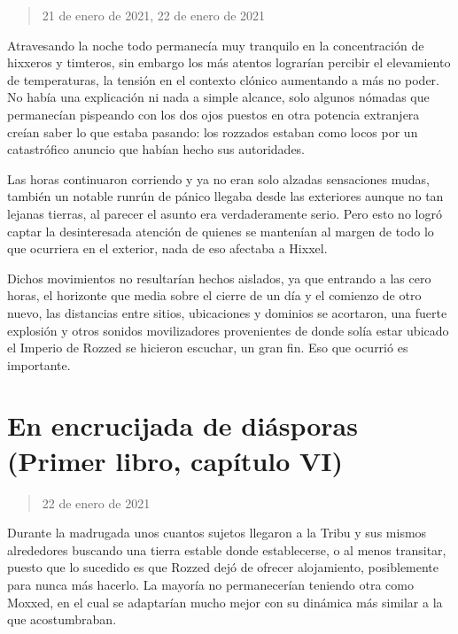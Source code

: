 \documentclass[
]{book}
\begin{document}
\begin{quote}
21 de enero de 2021, 22 de enero de 2021
\end{quote}

Atravesando la noche todo permanecía muy tranquilo en la concentración de hixxeros y timteros, sin embargo los más atentos lograrían percibir el elevamiento de temperaturas, la tensión en el contexto clónico aumentando a más no poder. No había una explicación ni nada a simple alcance, solo algunos nómadas que permanecían pispeando con los dos ojos puestos en otra potencia extranjera creían saber lo que estaba pasando: los rozzados estaban como locos por un catastrófico anuncio que habían hecho sus autoridades.

Las horas continuaron corriendo y ya no eran solo alzadas sensaciones mudas, también un notable runrún de pánico llegaba desde las exteriores aunque no tan lejanas tierras, al parecer el asunto era verdaderamente serio. Pero esto no logró captar la desinteresada atención de quienes se mantenían al margen de todo lo que ocurriera en el exterior, nada de eso afectaba a Hixxel.

Dichos movimientos no resultarían hechos aislados, ya que entrando a las cero horas, el horizonte que media sobre el cierre de un día y el comienzo de otro nuevo, las distancias entre sitios, ubicaciones y dominios se acortaron, una fuerte explosión y otros sonidos movilizadores provenientes de donde solía estar ubicado el Imperio de Rozzed se hicieron escuchar, un gran fin. Eso que ocurrió es importante.

\hypertarget{en-encrucijada-de-diuxe1sporas-primer-libro-capuxedtulo-vi}{%
\section{En encrucijada de diásporas (Primer libro, capítulo VI)}\label{en-encrucijada-de-diuxe1sporas-primer-libro-capuxedtulo-vi}}

\begin{quote}
22 de enero de 2021
\end{quote}

Durante la madrugada unos cuantos sujetos llegaron a la Tribu y sus mismos alrededores buscando una tierra estable donde establecerse, o al menos transitar, puesto que lo sucedido es que Rozzed dejó de ofrecer alojamiento, posiblemente para nunca más hacerlo. La mayoría no permanecerían teniendo otra como Moxxed, en el cual se adaptarían mucho mejor con su dinámica más similar a la que acostumbraban.
\end{document}
